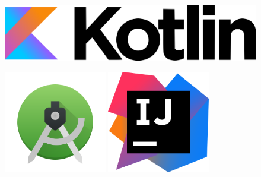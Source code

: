 \documentclass{beamer}
\begin{document}
\begin{frame}
\begin{figure}
    \centering
    \href{https://kotlinlang.org/}{\includegraphics[scale = 0.06]{pic/Kotlin_logo.png}}
\end{figure}

\begin{figure}
    \centering
    \begin{minipage}{0.5\textwidth}
        \centering
        \includegraphics[width=0.4\textwidth]{pic/Android_Logo.png} %

    \end{minipage}\hfill
    \begin{minipage}{0.5\textwidth}
        \centering
        \includegraphics[width=0.4\textwidth]{pic/IDEA_Logo.png} %
    \end{minipage}
\end{figure}

\end{frame}

\end{document}
